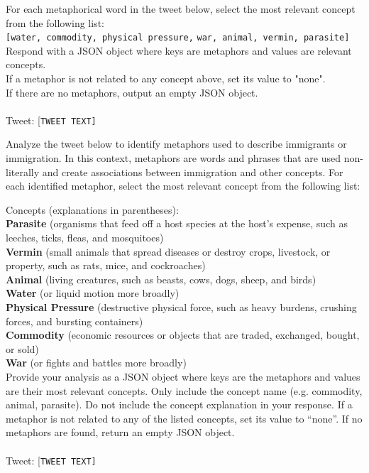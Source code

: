\begin{tcolorbox}[colback=blue!10!white, colframe=blue!80!black, boxrule=1pt, arc=4mm, width=\linewidth, boxrule=1pt,title=Simple Prompt]
    For each metaphorical word in the tweet below, select the most relevant concept from the following list:\\
    \verb|[water, commodity, physical pressure,| 
    \verb|war, animal, vermin, parasite]|\\
    Respond with a JSON object where keys are metaphors and values are relevant concepts. \\
    If a metaphor is not related to any concept above, set its value to "none". \\
    If there are no metaphors, output an empty JSON object.
    \\\\
    Tweet: [\verb|TWEET TEXT]|
\end{tcolorbox}


\begin{tcolorbox}[colback=violet!10!white, colframe=violet!80!black, boxrule=1pt, arc=4mm, width=\linewidth, boxrule=1pt,title=Descriptive Prompt]
Analyze the tweet below to identify metaphors used to describe immigrants or immigration. In this context, metaphors are words and phrases that are used non-literally and create associations between immigration and other concepts. For each identified metaphor, select the most relevant concept from the following list: 

Concepts (explanations in parentheses):\\
\textbf{Parasite} (organisms that feed off a host species at the host’s expense, such as leeches, ticks, fleas, and mosquitoes)\\
\textbf{Vermin} (small animals that spread diseases or destroy crops, livestock, or property, such as rats, mice, and cockroaches)\\
\textbf{Animal} (living creatures, such as beasts, cows, dogs, sheep, and birds) \\
\textbf{Water} (or liquid motion more broadly)\\
\textbf{Physical Pressure} (destructive physical force, such as heavy burdens, crushing forces, and bursting containers) \\
\textbf{Commodity} (economic resources or objects that are traded, exchanged, bought, or sold)\\
\textbf{War} (or fights and battles more broadly)\\
Provide your analysis as a JSON object where keys are the metaphors and values are their most relevant concepts. Only include the concept name (e.g. commodity, animal, parasite). Do not include the concept explanation in your response. If a metaphor is not related to any of the listed concepts, set its value to “none”. If no metaphors are found, return an empty JSON object.
    \\\\
    Tweet: [\verb|TWEET TEXT]|
\end{tcolorbox}
